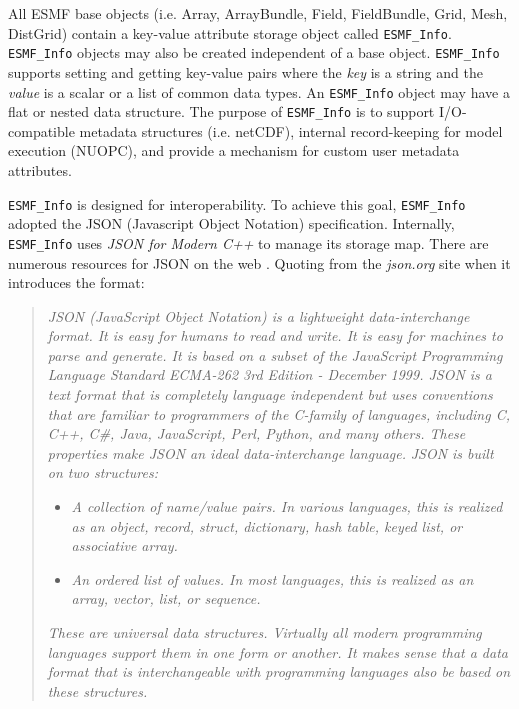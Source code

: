 
All ESMF base objects (i.e. Array, ArrayBundle, Field, FieldBundle, Grid, Mesh, DistGrid) contain a key-value attribute storage object called \texttt{ESMF\_Info}. \texttt{ESMF\_Info} objects may also be created independent of a base object. \texttt{ESMF\_Info} supports setting and getting key-value pairs where the \textit{key} is a string and the \textit{value} is a scalar or a list of common data types. An \texttt{ESMF\_Info} object may have a flat or nested data structure. The purpose of \texttt{ESMF\_Info} is to support I/O-compatible metadata structures (i.e. netCDF), internal record-keeping for model execution (NUOPC), and provide a mechanism for custom user metadata attributes.

\texttt{ESMF\_Info} is designed for interoperability. To achieve this goal, \texttt{ESMF\_Info} adopted the JSON (Javascript Object Notation) specification. Internally, \texttt{ESMF\_Info} uses \textit{JSON for Modern C++} \cite{json_for_modern_cpp} to manage its storage map. There are numerous resources for JSON on the web \cite{json}. Quoting from the \textit{json.org} site \cite{json} when it introduces the format:
\begin{quote}
    \textit{JSON (JavaScript Object Notation) is a lightweight data-interchange format. It is easy for humans to read and write. It is easy for machines to parse and generate. It is based on a subset of the JavaScript Programming Language Standard ECMA-262 3rd Edition - December 1999. JSON is a text format that is completely language independent but uses conventions that are familiar to programmers of the C-family of languages, including C, C++, C\#, Java, JavaScript, Perl, Python, and many others. These properties make JSON an ideal data-interchange language.}
    \textit{JSON is built on two structures:}
    \begin{itemize}
        \item \textit{A collection of name/value pairs. In various languages, this is realized as an object, record, struct, dictionary, hash table, keyed list, or associative array.}
        \item \textit{An ordered list of values. In most languages, this is realized as an array, vector, list, or sequence.}
    \end{itemize}
    \textit{These are universal data structures. Virtually all modern programming languages support them in one form or another. It makes sense that a data format that is interchangeable with programming languages also be based on these structures.}
\end{quote}

